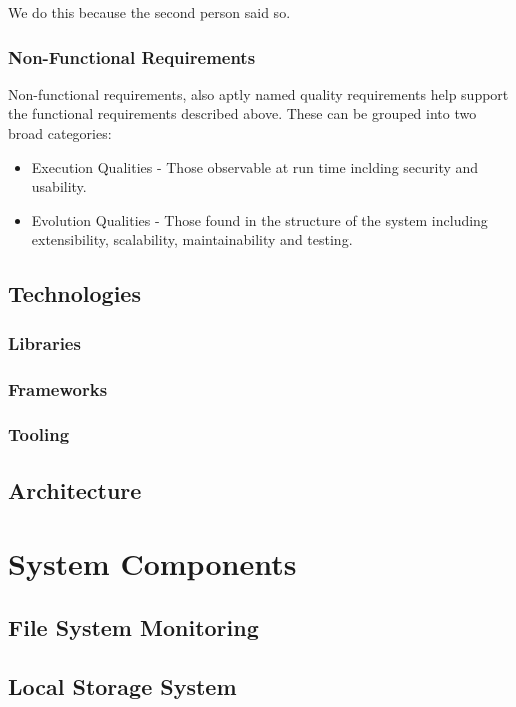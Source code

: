 \documentclass[a4paper, 11pt, twocolumn, twoside]{report}
\begin{document}
We do this because the second person said so. 

\subsection{Non-Functional Requirements}

Non-functional requirements, also aptly named quality requirements help support the functional requirements described above. These can be grouped into two broad categories:
\begin{itemize}
 \item Execution Qualities - Those observable at run time inclding security and usability.
 \item Evolution Qualities - Those found in the structure of the system including extensibility, scalability, maintainability and testing.
\end{itemize}

\section{Technologies}

\subsection{Libraries}

\subsection{Frameworks}

\subsection{Tooling}

\section{Architecture}

\chapter{System Components}

\section{File System Monitoring}

\section{Local Storage System}
\end{document}
